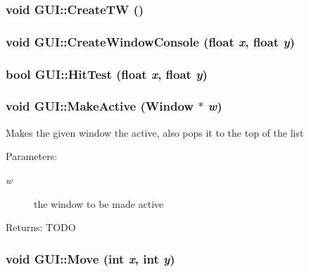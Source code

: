 \hypertarget{class_g_u_i_2f199fa669d2281e6af1b964dbb1a126}{
\subsubsection[{CreateTW}]{\setlength{\rightskip}{0pt plus 5cm}void GUI::CreateTW ()}}
\label{class_g_u_i_2f199fa669d2281e6af1b964dbb1a126}


\hypertarget{class_g_u_i_d7b46be5b0f53a7bb0b118f8cc209829}{
\subsubsection[{CreateWindowConsole}]{\setlength{\rightskip}{0pt plus 5cm}void GUI::CreateWindowConsole (float {\em x}, \/  float {\em y})}}
\label{class_g_u_i_d7b46be5b0f53a7bb0b118f8cc209829}


\hypertarget{class_g_u_i_44bbc42e5bbf222e0a6241dc21e23703}{
\subsubsection[{HitTest}]{\setlength{\rightskip}{0pt plus 5cm}bool GUI::HitTest (float {\em x}, \/  float {\em y})}}
\label{class_g_u_i_44bbc42e5bbf222e0a6241dc21e23703}


\hypertarget{class_g_u_i_ce0821f8bd3d1cb8feafae68ea29dee6}{
\subsubsection[{MakeActive}]{\setlength{\rightskip}{0pt plus 5cm}void GUI::MakeActive ({\bf Window} $\ast$ {\em w})}}
\label{class_g_u_i_ce0821f8bd3d1cb8feafae68ea29dee6}


Makes the given window the active, also pops it to the top of the list \begin{Desc}
\item[Parameters:]
\begin{description}
\item[{\em w}]the window to be made active \end{description}
\end{Desc}
\begin{Desc}
\item[Returns:]TODO \end{Desc}
\hypertarget{class_g_u_i_27467859beafc23672cd8ac5dff5dd61}{
\subsubsection[{Move}]{\setlength{\rightskip}{0pt plus 5cm}void GUI::Move (int {\em x}, \/  int {\em y})}}
\label{class_g_u_i_27467859beafc23672cd8ac5dff5dd61}


